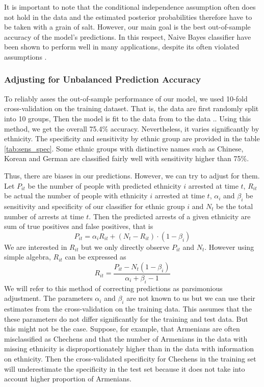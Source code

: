 It is important to note that the conditional independence assumption often does not hold in the data and the estimated posterior probabilities therefore have to be taken with a grain of salt. %
However, our main goal is the best out-of-sample accuracy of the model's predictions. In this respect, Naive Bayes classifier have been shown to perform  well in many applications, despite its often violated assumptions \citep{domingos_optimality_1997}.

\subsubsection{Adjusting for Unbalanced Prediction Accuracy}
To reliably asses the out-of-sample performance of our model, we used 10-fold cross-validation on the training dataset. That is, the data are first randomly split into 10 groups, Then the model is fit to the data from to the data ..  
Using this method, we get the overall 75.4\% accuracy. Nevertheless, it varies
significantly by ethnicity. The specificity and sensitivity by ethnic group are provided in the table \ref{tab:sens_spec}. Some ethnic groups with distinctive names such as Chinese, Korean and German are classified fairly well with sensitivity higher than 75\%. 

Thus, there are biases in our predictions. However, we can try to adjust for them. Let $P_{it}$ be the number of people with predicted ethnicity $i$ arrested at time $t$, $R_{it}$ be actual the number of people with ethnicity $i$ arrested at time $t$, $\alpha_i$ and $\beta_i$  be sensitivity and specificity of our classifier for ethnic group $i$ and $N_t$ be the total number of arrests at time $t$. Then the predicted arrests of a given ethnicity are sum of true positives and false positives, that is
\begin{equation}
    P_{it} = \alpha_i R_{it} + \left( N_t - R_{it} \right) \cdot \left(1 - \beta_i \right)  
\end{equation}
We are interested in $R_{it}$ but we only directly observe $P_{it}$ and $N_t$. However using simple algebra, $R_{it}$ can be expressed as
\begin{equation} \label{eq:pars_adj}
 R_{it} = \frac{P_{it} - N_t  \left(1 - \beta_i \right)}{\alpha_i + \beta_i - 1}
\end{equation}
We will refer to this method of correcting predictions as parsimonious adjustment.  The parameters $\alpha_i$ and $\beta_i$ are not known to us but we can use their estimates from the cross-validation on the training data. This assumes that the these parameters do not differ significantly for the training and test data. But this might not be the case. 
Suppose, for example, that Armenians are often misclassified as Chechens and that the number of Armenians in the data with missing ethnicity  is disproportionately higher than in the data with information on ethnicity. 
Then the cross-validated specificity for Chechens in the training set will underestimate the specificity in the test set because it does not take into account higher proportion of Armenians. 

